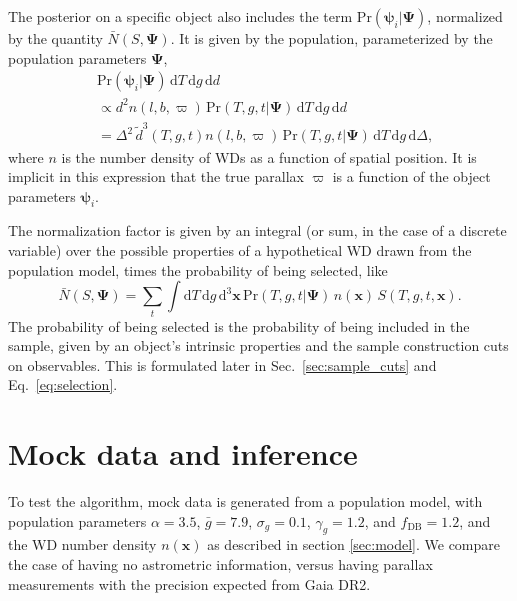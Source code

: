 \documentclass[fleqn,usenatbib]{mnras}
\newcommand{\popp}{\boldsymbol{\Psi}}
\newcommand{\objp}{\boldsymbol{\psi}}
\newcommand{\Teff}{T}
\newcommand{\logg}{g}
\newcommand{\pr}{\text{Pr}}
\newcommand{\de}{\text{d}}
\begin{document}
The posterior on a specific object also includes the term $\pr(\objp_i | \popp)$, normalized by the quantity $\bar{N}(S,\popp)$. It is given by the population, parameterized by the population parameters $\popp$,
\begin{equation}
\begin{split}
	& \pr(\objp_i | \popp)\, \de \Teff\, \de \logg\, \de d  \\ & \propto
    d^2 n(l,b,\varpi)\, \pr(\Teff,g,t | \popp)\, \de \Teff\, \de \logg\, \de d \\
    & = \Delta^2\, \tilde{d}^3(\Teff,\logg,t) n(l,b,\varpi)\, \pr(\Teff,g,t | \popp)\, \de \Teff\, \de\logg\, \de \Delta,
\end{split}
\end{equation}
where $n$ is the number density of WDs as a function of spatial position. It is implicit in this expression that the true parallax $\varpi$ is a function of the object parameters $\objp_i$.

The normalization factor is given by an integral (or sum, in the case of a discrete variable) over the possible properties of a hypothetical WD drawn from the population model, times the probability of being selected, like
\begin{equation}\label{eq:normalization}
	\bar{N}(S,\popp) = \sum_{t} \int \de\Teff\, \de \logg\, \de^3\mathbf{x}\,
    \pr(\Teff,g,t | \popp)\, n(\mathbf{x})\, S(\Teff,\logg,t,\mathbf{x}).
\end{equation}
The probability of being selected is the probability of being included in the sample, given by an object's intrinsic properties and the sample construction cuts on observables. This is formulated later in Sec.~\ref{sec:sample_cuts} and Eq.~\eqref{eq:selection}.







\section{Mock data and inference}\label{sec:mock}

To test the algorithm, mock data is generated from a population model, with population parameters $\alpha=3.5$, $\bar{g}=7.9$, $\sigma_g=0.1$, $\gamma_g=1.2$, and $f_\text{DB}=1.2$, and the WD number density $n(\mathbf{x})$ as described in section \ref{sec:model}. We compare the case of having no astrometric information, versus having parallax measurements with the precision expected from Gaia DR2.
\end{document}

